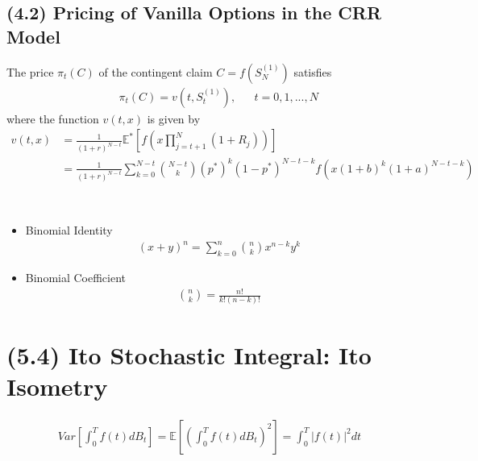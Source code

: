 \documentclass[12pt]{extarticle}
\newcommand{\<}{\langle}
\renewcommand{\>}{\rangle}
\theoremstyle{definition}
\begin{document}
\subsection{(4.2) Pricing of Vanilla Options in the CRR Model}
\begin{tcolorbox}[enhanced, drop fuzzy shadow, title=Proposition 4.8]
The price $\pi_t(C)$ of the contingent claim $C=f(S_N^{(1)})$ satisfies
\begin{align*}
    && \pi_t(C) = v(t,S_t^{(1)}), && t=0,1,...,N
\end{align*}
where the function $v(t,x)$ is given by
\begin{align*}
    v(t,x) &= \frac{1}{(1+r)^{N-t}}\mathbb{E}^* \left[ f\left(x\prod^N_{j=t+1}(1+R_j) \right)\right]\\
    &= \frac{1}{(1+r)^{N-t}} \sum^{N-t}_{k=0} \binom{N-t}{k}(p^*)^k (1-p^*)^{N-t-k}f(x(1+b)^k (1+a)^{N-t-k})
\end{align*}
\end{tcolorbox}
\ \\
\begin{tcolorbox}[enhanced, drop fuzzy shadow, title=Useful note; Binomial Identity and Coefficient]
\begin{itemize}
    \item Binomial Identity
    \begin{align*}
    (x+y)^n = \sum_{k=0}^n \binom{n}{k} x^{n-k} y^k
    \end{align*}
    \item Binomial Coefficient
    \begin{align*}
    \binom{n}{k}=\frac{n!}{k!(n-k)!}
    \end{align*}
\end{itemize}
\end{tcolorbox}

\newpage
\section{(5.4) Ito Stochastic Integral: Ito Isometry}
\begin{tcolorbox}[enhanced, drop fuzzy shadow, title=Proposition 5.9; Ito Isometry]
\begin{align*}
    Var\left[\int^T_0 f(t)dB_t \right] = \mathbb{E}\left[\left(\int^T_0 f(t)dB_t \right)^2 \right] = \int^T_0 \big|f(t)\big|^2 dt
\end{align*}
\end{tcolorbox}
\end{document}
